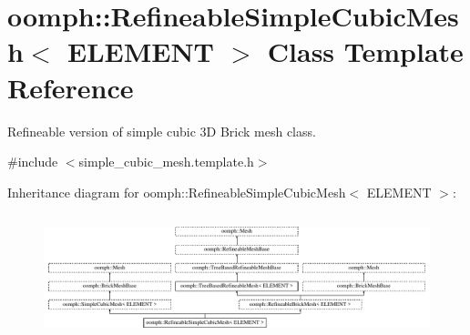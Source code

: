 \hypertarget{classoomph_1_1RefineableSimpleCubicMesh}{}\section{oomph\+:\+:Refineable\+Simple\+Cubic\+Mesh$<$ E\+L\+E\+M\+E\+NT $>$ Class Template Reference}
\label{classoomph_1_1RefineableSimpleCubicMesh}


Refineable version of simple cubic 3D Brick mesh class.  




{\ttfamily \#include $<$simple\+\_\+cubic\+\_\+mesh.\+template.\+h$>$}

Inheritance diagram for oomph\+:\+:Refineable\+Simple\+Cubic\+Mesh$<$ E\+L\+E\+M\+E\+NT $>$\+:\begin{figure}[H]
\begin{center}
\leavevmode
\includegraphics[height=3.660131cm]{classoomph_1_1RefineableSimpleCubicMesh}
\end{center}
\end{figure}
